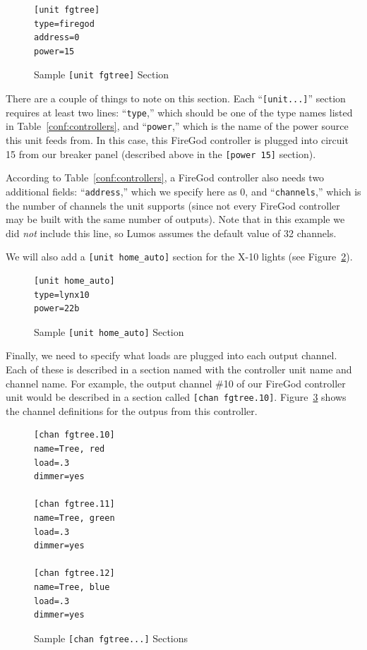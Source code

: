 \documentclass{article}
\begin{document}
\begin{figure}[htbp]
\begin{verbatim}
[unit fgtree]
type=firegod
address=0
power=15
\end{verbatim}
\caption{Sample {\tt[unit fgtree]} Section}
\label{conf:fgtree}
\end{figure}

There are a couple of things to note on this section.  Each 
``{\tt[unit...]}'' section requires at least two lines: ``{\tt type},'' which
should be one of the type names listed in Table~\ref{conf:controllers}, and 
``{\tt power},'' which is the name of the power source this unit feeds from.
In this case, this FireGod controller is plugged into circuit 15 from our
breaker panel (described above in the {\tt[power~15]} section).

According to Table~\ref{conf:controllers}, a FireGod controller also needs two
additional fields: ``{\tt address},'' which we specify here as 0, and 
``{\tt channels},'' which is the number of channels the unit supports (since 
not every FireGod controller may be built with the same number of outputs).
Note that in this example we did {\em not\/} include this line, so Lumos
assumes the default value of 32 channels.

We will also add a \verb+[unit home_auto]+ section for the X-10 lights (see
Figure~\ref{conf:x10}).

\begin{figure}[htbp]
\begin{verbatim}
[unit home_auto]
type=lynx10
power=22b
\end{verbatim}
\caption{Sample {\tt[unit~home\_auto]} Section}
\label{conf:x10}
\end{figure}

Finally, we need to specify what loads are plugged into each output channel.
Each of these is described in a section named with the controller unit name
and channel name.  For example, the output channel \#10 of our FireGod
controller unit would be described in a section called {\tt[chan~fgtree.10]}.
Figure~\ref{conf:fgtree10} shows the channel definitions for the outpus from
this controller.

\begin{figure}[htbp]
\begin{verbatim}
[chan fgtree.10]
name=Tree, red
load=.3
dimmer=yes

[chan fgtree.11]
name=Tree, green
load=.3
dimmer=yes

[chan fgtree.12]
name=Tree, blue
load=.3
dimmer=yes
\end{verbatim}
\caption{Sample {\tt[chan fgtree...]} Sections}
\label{conf:fgtree10}
\end{figure}
\end{document}
